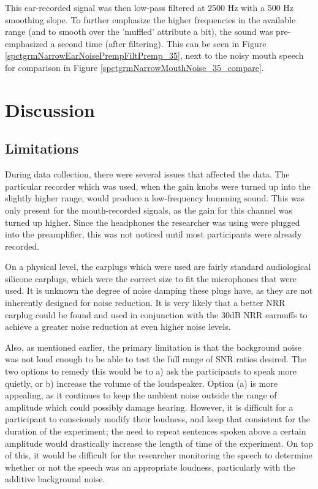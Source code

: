 \documentclass[dissertation,copyright]{uathesis}
\begin{document}
This ear-recorded signal was then low-pass filtered at 2500 Hz with a 500 Hz smoothing slope. To further emphasize the higher frequencies in the available range (and to smooth over the 'muffled' attribute a bit), the sound was pre-emphasized a second time (after filtering).  This can be seen in Figure \ref{spctgrmNarrowEarNoisePrempFiltPremp_35}, next to the noisy mouth speech for comparison in Figure \ref{spctgrmNarrowMouthNoise_35_compare}.

\section{Discussion}

\subsection{Limitations}

During data collection, there were several issues that affected the data.  
The particular recorder which was used, when the gain knobs were turned up into the slightly higher range, would produce a low-frequency humming sound.  This was only present for the mouth-recorded signals, as the gain for this channel was turned up higher.  Since the headphones the researcher was using were plugged into the preamplifier, this was not noticed until most participants were already recorded.

On a physical level, the earplugs which were used are fairly standard audiological silicone earplugs, which were the correct size to fit the microphones that were used.  It is unknown the degree of noise damping these plugs have, as they are not inherently designed for noise reduction.  It is very likely that a better NRR earplug could be found and used in conjunction with the 30dB NRR earmuffs to achieve a greater noise reduction at even higher noise levels.

Also, as mentioned earlier, the primary limitation is that the background noise was not loud enough to be able to test the full range of SNR ratios desired.  The two options to remedy this would be to a) ask the participants to speak more quietly, or b) increase the volume of the loudspeaker.  Option (a) is more appealing, as it continues to keep the ambient noise outside the range of amplitude which could possibly damage hearing.  However, it is difficult for a participant to consciously modify their loudness, and keep that consistent for the duration of the experiment; the need to repeat sentences spoken above a certain amplitude would drastically increase the length of time of the experiment.  On top of this, it would be difficult for the researcher monitoring the speech to determine whether or not the speech was an appropriate loudness, particularly with the additive background noise.  
\end{document}
